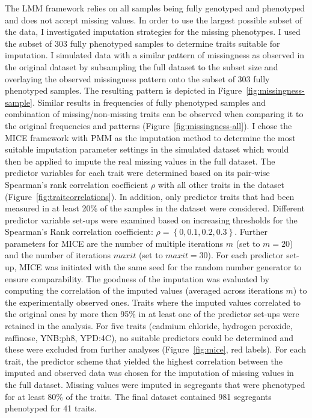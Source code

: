 The LMM framework relies on all samples being fully genotyped and phenotyped and does not accept missing values. In order to use the largest possible subset of the data, I investigated imputation strategies for the missing phenotypes. I used the subset of 303 fully phenotyped samples to determine traits suitable for imputation. I simulated data with a similar pattern of missingness as observed in the original dataset by subsampling the full dataset to the subset size and overlaying the observed missingness pattern onto the subset of 303 fully phenotyped samples. The resulting pattern is depicted in Figure~\ref{fig:missingness-sample}. Similar results in frequencies of fully phenotyped samples and combination of missing/non-missing traits can be observed when comparing it to the original frequencies and patterns (Figure~\ref{fig:missingness-all}). I chose the MICE framework \citep{vanBuuren2011} with PMM as the imputation method to determine the most suitable imputation parameter settings in the simulated dataset which would then be applied to impute the real missing values in the full dataset. The predictor variables for each trait were determined based on its pair-wise Spearman's rank correlation coefficient \(\rho\) with all other traits in the dataset (Figure~\ref{fig:traitcorrelations}). In addition, only predictor traits that had been measured in at least 20\% of the samples in the dataset were considered. Different predictor variable set-ups were examined based on increasing thresholds for the Spearman's Rank correlation coefficient: \(\rho =\left\{0, 0.1, 0.2, 0.3\right\}\). Further parameters for MICE are the number of multiple iterations \(m\) (set to \(m=20\)) and the number of iterations \(maxit\) (set to \(maxit=30\)). For each predictor set-up, MICE was initiated with the same seed for the random number generator to ensure comparability. The goodness of the imputation was evaluated by computing the correlation of the imputed values (averaged across iterations \(m\)) to the experimentally observed ones. Traits where the imputed values correlated to the original ones by more then 95\% in at least one of the predictor set-ups were retained in the analysis. For five traits (cadmium chloride, hydrogen peroxide, raffinose, YNB:ph8, YPD:4C), no suitable predictors could be determined and these were excluded from further analyses (Figure~\ref{fig:mice}, red labels). For each trait, the predictor scheme that yielded the highest correlation between the imputed and observed data was chosen for the imputation of missing values in the full dataset. Missing values were imputed in segregants that were phenotyped for at least 80\% of the traits. The final dataset contained 981 segregants phenotyped for 41 traits. 

